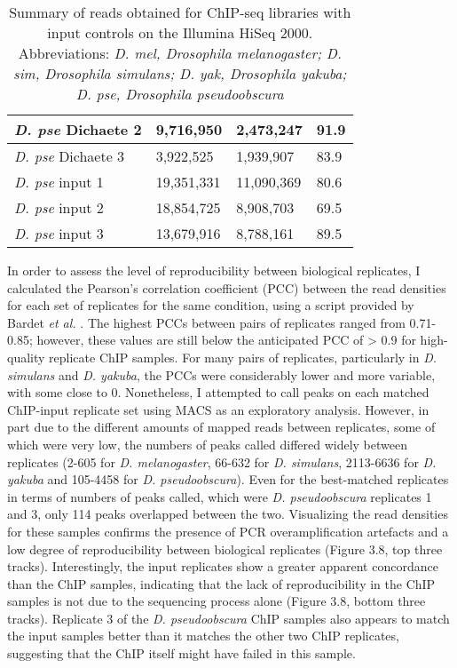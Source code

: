 \begin{table}[h]
\begin{tabular}{|l|l|l|l|}
\emph{D. pse} Dichaete 2 & 9,716,950   & 2,473,247    & 91.9               \\ \hline
\emph{D. pse} Dichaete 3 & 3,922,525   & 1,939,907    & 83.9               \\ \hline
\emph{D. pse} input 1    & 19,351,331  & 11,090,369   & 80.6               \\ \hline
\emph{D. pse} input 2    & 18,854,725  & 8,908,703    & 69.5               \\ \hline
\emph{D. pse} input 3    & 13,679,916  & 8,788,161    & 89.5               \\ \hline
\end{tabular}
\caption{Summary of reads obtained for ChIP-seq libraries with input controls on the Illumina HiSeq 2000. Abbreviations: \emph{D. mel, Drosophila melanogaster; D. sim, Drosophila simulans; D. yak, Drosophila yakuba; D. pse, Drosophila pseudoobscura}}
\label{Table 3.3}
\end{table}

In order to assess the level of reproducibility between biological replicates, I calculated the Pearson’s correlation coefficient (PCC) between the read densities for each set of replicates for the same condition, using a script provided by Bardet \emph{et al.} \citet{bardet_computational_2011}. The highest PCCs between pairs of replicates ranged from 0.71-0.85; however, these values are still below the anticipated PCC of > 0.9 for high-quality replicate ChIP samples. For many pairs of replicates, particularly in \emph{D. simulans} and \emph{D. yakuba}, the PCCs were considerably lower and more variable, with some close to 0. Nonetheless, I attempted to call peaks on each matched ChIP-input replicate set using MACS as an exploratory analysis. However, in part due to the different amounts of mapped reads between replicates, some of which were very low, the numbers of peaks called differed widely between replicates (2-605 for \emph{D. melanogaster}, 66-632 for \emph{D. simulans}, 2113-6636 for \emph{D. yakuba} and 105-4458 for \emph{D. pseudoobscura}). Even for the best-matched replicates in terms of numbers of peaks called, which were \emph{D. pseudoobscura} replicates 1 and 3, only 114 peaks overlapped between the two. Visualizing the read densities for these samples confirms the presence of PCR overamplification artefacts and a low degree of reproducibility between biological replicates (Figure 3.8, top three tracks). Interestingly, the input replicates show a greater apparent concordance than the ChIP samples, indicating that the lack of reproducibility in the ChIP samples is not due to the sequencing process alone (Figure 3.8, bottom three tracks). Replicate 3 of the \emph{D. pseudoobscura} ChIP samples also appears to match the input samples better than it matches the other two ChIP replicates, suggesting that the ChIP itself might have failed in this sample.

